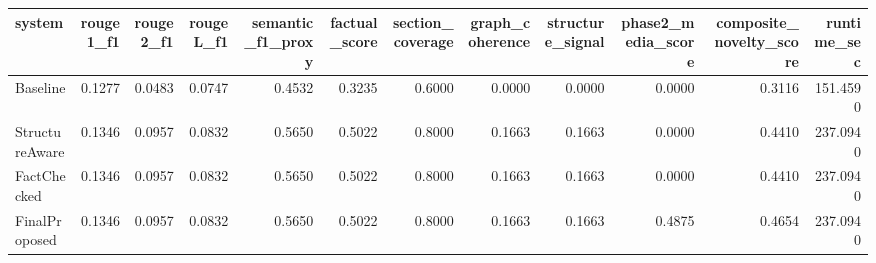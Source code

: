\begin{tabular}{lrrrrrrrrrrr}
\toprule
system & rouge1_f1 & rouge2_f1 & rougeL_f1 & semantic_f1_proxy & factual_score & section_coverage & graph_coherence & structure_signal & phase2_media_score & composite_novelty_score & runtime_sec \\
\midrule
Baseline & 0.1277 & 0.0483 & 0.0747 & 0.4532 & 0.3235 & 0.6000 & 0.0000 & 0.0000 & 0.0000 & 0.3116 & 151.4590 \\
StructureAware & 0.1346 & 0.0957 & 0.0832 & 0.5650 & 0.5022 & 0.8000 & 0.1663 & 0.1663 & 0.0000 & 0.4410 & 237.0940 \\
FactChecked & 0.1346 & 0.0957 & 0.0832 & 0.5650 & 0.5022 & 0.8000 & 0.1663 & 0.1663 & 0.0000 & 0.4410 & 237.0940 \\
FinalProposed & 0.1346 & 0.0957 & 0.0832 & 0.5650 & 0.5022 & 0.8000 & 0.1663 & 0.1663 & 0.4875 & 0.4654 & 237.0940 \\
\bottomrule
\end{tabular}
